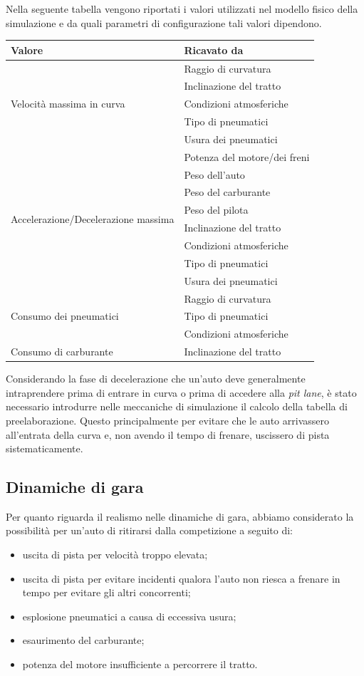 Nella seguente tabella vengono riportati i valori utilizzati nel modello fisico della simulazione e da quali parametri di configurazione tali valori dipendono.

\begin{center}
\begin{tabular}{|l|l|}
\hline
\textbf{Valore} & \textbf{Ricavato da} \\
\hline
\multirow{5}{*}{Velocità massima in curva} & Raggio di curvatura\\
& Inclinazione del tratto\\
& Condizioni atmosferiche\\
& Tipo di pneumatici\\
& Usura dei pneumatici\\
\hline
\multirow{8}{*}{Accelerazione/Decelerazione massima} & Potenza del motore/dei freni\\
& Peso dell'auto\\
& Peso del carburante\\
& Peso del pilota\\
& Inclinazione del tratto\\
& Condizioni atmosferiche\\
& Tipo di pneumatici\\
& Usura dei pneumatici\\
\hline
\multirow{3}{*}{Consumo dei pneumatici} & Raggio di curvatura\\
& Tipo di pneumatici\\
& Condizioni atmosferiche\\
\hline
Consumo di carburante & Inclinazione del tratto\\
\hline
\end{tabular}
\end{center}

Considerando la fase di decelerazione che un'auto deve generalmente intraprendere prima di entrare in curva o prima di accedere alla \textit{pit lane}, è stato necessario introdurre nelle meccaniche di simulazione il calcolo della tabella di preelaborazione. Questo principalmente per evitare che le auto arrivassero all'entrata della curva e, non avendo il tempo di frenare, uscissero di pista sistematicamente.

\subsection*{Dinamiche di gara}
Per quanto riguarda il realismo nelle dinamiche di gara, abbiamo considerato la possibilità per un'auto di ritirarsi dalla competizione a seguito di:
\begin{itemize}
\item uscita di pista per velocità troppo elevata;
\item uscita di pista per evitare incidenti qualora l'auto non riesca a frenare in tempo per evitare gli altri concorrenti;
\item esplosione pneumatici a causa di eccessiva usura;
\item esaurimento del carburante;
\item potenza del motore insufficiente a percorrere il tratto.
\end{itemize}

